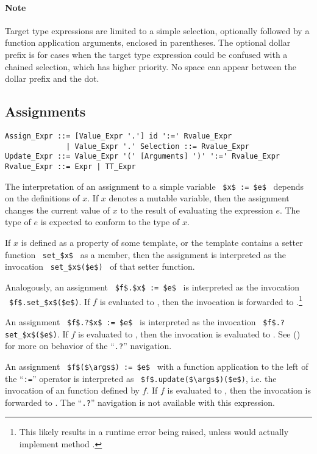 \paragraph{Note}
Target type expressions are limited to a simple selection, optionally followed by a function application arguments, enclosed in parentheses. The optional dollar prefix is for cases when the target type expression could be confused with a chained selection, which has higher priority. No space can appear between the dollar prefix and the dot. 





\subsection{Assignments}

\syntax\begin{lstlisting}
Assign_Expr ::= [Value_Expr '.'] id ':=' Rvalue_Expr
              | Value_Expr '.' Selection ::= Rvalue_Expr
Update_Expr ::= Value_Expr '(' [Arguments] ')' ':=' Rvalue_Expr
Rvalue_Expr ::= Expr | TT_Expr
\end{lstlisting}

The interpretation of an assignment to a simple variable ~\lstinline!$x$ := $e$!~ depends on the definitions of $x$. If $x$ denotes a mutable variable, then the assignment changes the current value of $x$ to the result of evaluating the expression $e$. The type of $e$ is expected to conform to the type of $x$. 

If $x$ is defined as a property of some template, or the template contains a setter function ~\lstinline!set_$x$!~ as a member, then the assignment is interpreted as the invocation ~\lstinline!set_$x$($e$)!~ of that setter function. 

Analogously, an assignment ~\lstinline!$f$.$x$ := $e$!~ is interpreted as the invocation ~\lstinline!$f$.set_$x$($e$)!. If $f$ is evaluated to , then the invocation is forwarded to .\footnote{This likely results in a runtime error being raised, unless  would actually implement method .} 

An assignment ~\lstinline!$f$.?$x$ := $e$!~ is interpreted as the invocation ~\lstinline!$f$.?set_$x$($e$)!. If $f$ is evaluated to , then the invocation is evaluated to . See () for more on behavior of the ``\lstinline!.?!'' navigation. 

An assignment ~\lstinline!$f$($\args$) := $e$!~ with a function application to the left of the ``\lstinline!:=!'' operator is interpreted as ~\lstinline!$f$.update($\args$)($e$)!, i.e. the invocation of an  function defined by $f$. If $f$ is evaluated to , then the invocation is forwarded to . The ``\lstinline!.?!'' navigation is not available with this expression. 


